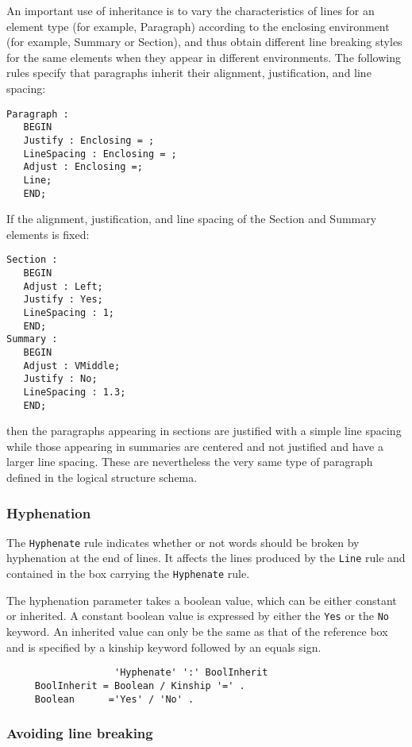\begin{example}
An important use of inheritance is to vary the characteristics of
lines for an element type (for example, Paragraph) according to the
enclosing environment (for example, Summary or Section), and thus
obtain different line breaking styles for the same elements when they
appear in different environments.  The following rules specify that
paragraphs inherit their alignment, justification, and line spacing:
\begin{verbatim}
Paragraph :
   BEGIN
   Justify : Enclosing = ;
   LineSpacing : Enclosing = ;
   Adjust : Enclosing =;
   Line;
   END;
\end{verbatim}
If the alignment, justification, and line spacing of the Section
and Summary  elements is fixed:
\begin{verbatim}
Section :
   BEGIN
   Adjust : Left;
   Justify : Yes;
   LineSpacing : 1;
   END;
Summary :
   BEGIN
   Adjust : VMiddle;
   Justify : No;
   LineSpacing : 1.3;
   END;
\end{verbatim}
then the paragraphs appearing in sections are justified with a simple
line spacing while those appearing in summaries are centered and not
justified and have a larger line spacing.  These are nevertheless the
very same type of paragraph defined in the logical structure schema.
\end{example}

\subsubsection{Hyphenation}
\label{reglehyphenate}

The {\tt Hyphenate} rule indicates whether or not words should be
broken by hyphenation at the end of lines.  It affects the lines
produced by the {\tt Line} rule and contained in the box carrying the
{\tt Hyphenate} rule.

The hyphenation parameter takes a boolean value, which can be either
constant or inherited.  A constant boolean value is expressed by
either the {\tt Yes} or the {\tt No} keyword.  An inherited value can
only be the same as that of the reference box and is specified by a
kinship keyword followed by an equals sign.

\begin{verbatim}
                   'Hyphenate' ':' BoolInherit
     BoolInherit = Boolean / Kinship '=' .
     Boolean      ='Yes' / 'No' .
\end{verbatim}

\subsubsection{Avoiding line breaking}
\label{regleinline}

